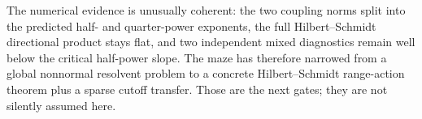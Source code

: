 \documentclass[11pt]{article}
\theoremstyle{definition}
\theoremstyle{remark}
\begin{document}
The numerical evidence is unusually coherent: the two coupling norms split
into the predicted half- and quarter-power exponents, the full
Hilbert--Schmidt directional product stays flat, and two independent mixed
diagnostics remain well below the critical half-power slope.  The maze has
therefore narrowed from a global nonnormal resolvent problem to a concrete
Hilbert--Schmidt range-action theorem plus a sparse cutoff transfer.  Those
are the next gates; they are not silently assumed here.



\end{document}
